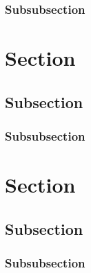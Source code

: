 \subsubsection{Subsubsection}
\lipsum[3] %

\section{Section}
\lipsum[1] %

\subsection{Subsection}
\lipsum[2] %

\subsubsection{Subsubsection}
\lipsum[3] %

\section{Section}
\lipsum[1] %

\subsection{Subsection}
\lipsum[2] %

\subsubsection{Subsubsection}
\lipsum[3] %